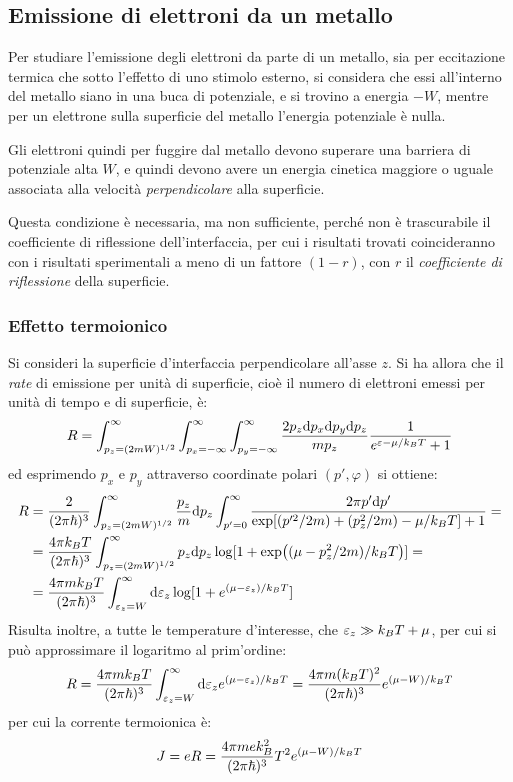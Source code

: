 \subsection{Emissione di elettroni da un metallo}

Per studiare l'emissione degli elettroni da parte di un metallo, sia per eccitazione termica che sotto l'effetto di uno stimolo esterno, si considera che essi all'interno del metallo siano in una buca di potenziale, e si trovino a energia $ - W $, mentre per un elettrone sulla superficie del metallo l'energia potenziale è nulla.

Gli elettroni quindi per fuggire dal metallo devono superare una barriera di potenziale alta $ W $, e quindi devono avere un energia cinetica maggiore o uguale associata alla velocità \textit{perpendicolare} alla superficie.

Questa condizione è necessaria, ma non sufficiente, perché non è trascurabile il coefficiente di riflessione dell'interfaccia, per cui i risultati trovati coincideranno con i risultati sperimentali a meno di un fattore $ (1 - r) $, con $ r $ il \textit{coefficiente di riflessione} della superficie.

\subsubsection{Effetto termoionico}

Si consideri la superficie d'interfaccia perpendicolare all'asse $ z $. Si ha allora che il \textit{rate} di emissione per unità di superficie, cioè il numero di elettroni emessi per unità di tempo e di superficie, è:
\[ R = \int_{p_z = (2mW)^{1/2}}^{\infty}\int_{p_x = -\infty}^{\infty} \int_{p_y = -\infty}^{\infty} \frac{2p_z \dd p_x \dd p_y \dd p_z}{m p_z}\frac{1}{e^{\varepsilon - \mu / k_B T} + 1} \]
ed esprimendo $ p_x $ e $ p_y $ attraverso coordinate polari $ (p', \varphi) $ si ottiene:
\begin{align*}
R &= \frac{2}{(2\pi \hbar)^3}\int_{p_z = (2mW)^{1/2}}^{\infty} \frac{p_z}{m} \dd p_z \int_{p' = 0}^{\infty} \frac{2\pi p' \dd p'}{\exp[(p'^2/2m) + (p_z^2/2m) - \mu / k_B T] + 1} =\\
&= \frac{4\pi k_B T}{(2\pi \hbar)^3} \int_{p_z = (2mW)^{1/2}}^{\infty} p_z \dd p_z \log[1 + \exp((\mu - p_z^2/2m)/k_B T)]=\\
&= \frac{4\pi m k_B T}{(2\pi \hbar)^3} \int_{\varepsilon_z = W}^{\infty} \dd \varepsilon_z \log[1 + e^{(\mu - \varepsilon_z)/k_B T}]
\end{align*}
Risulta inoltre, a tutte le temperature d'interesse, che $ \varepsilon_z \gg k_B T + \mu $, per cui si può approssimare il logaritmo al prim'ordine:
\[ R = \frac{4\pi m k_B T}{(2\pi \hbar)^3} \int_{\varepsilon_z = W}^{\infty} \dd \varepsilon_z e^{(\mu - \varepsilon_z)/k_B T} = \frac{4\pi m (k_B T)^2}{(2\pi \hbar)^3} e^{(\mu - W)/k_B T} \]
per cui la corrente termoionica è:
\[ J = e R =  \frac{4\pi m e k_B^2}{(2\pi \hbar)^3} T^2 e^{(\mu - W)/k_B T} \]

